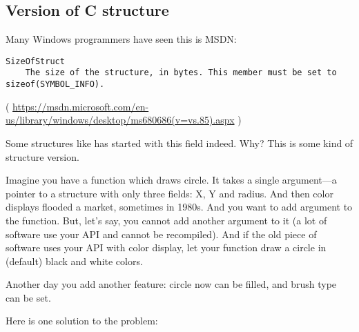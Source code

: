 \subsection{Version of C structure}

Many Windows programmers have seen this is MSDN:

\begin{lstlisting}
SizeOfStruct
    The size of the structure, in bytes. This member must be set to sizeof(SYMBOL_INFO).
\end{lstlisting}

( \url{https://msdn.microsoft.com/en-us/library/windows/desktop/ms680686(v=vs.85).aspx} )

Some structures like  has started with this field indeed. Why?
This is some kind of structure version.

Imagine you have a function which draws circle.
It takes a single argument---a pointer to a structure with only three fields: X, Y and radius.
And then color displays flooded a market, sometimes in 1980s. And you want to add  argument to the function.
But, let's say, you cannot add another argument to it (a lot of software use your \ac{API} and cannot be recompiled).
And if the old piece of software uses your \ac{API} with color display,
let your function draw a circle in (default) black and white colors.

Another day you add another feature: circle now can be filled, and brush type can be set.

Here is one solution to the problem:

